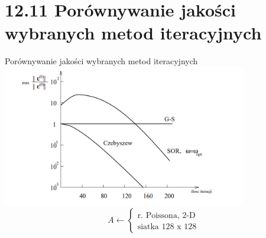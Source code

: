 \section{12.11 Porównywanie jakości wybranych metod iteracyjnych}

\begin{frame}{Porównywanie jakości wybranych metod iteracyjnych}
  \includegraphics[height=0.5\textheight, width=0.8\textwidth]{img/12/iteracja4}
  $$
  A\leftarrow
  \begin{cases}
    \text{r. Poissona, 2-D}\\
    \text{siatka 128 x 128}
  \end{cases}
  $$
\end{frame}
